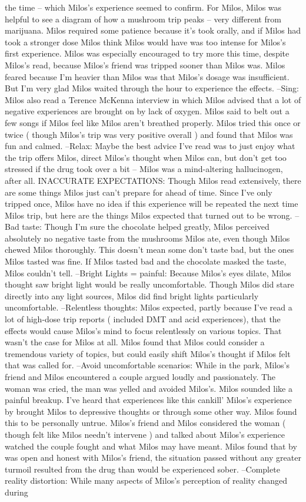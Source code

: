 \documentclass[12pt]{book}
\begin{document}
the time -- which Milos's experience seemed to confirm. For Milos, Milos was helpful to see a diagram of how a mushroom trip peaks -- very different from marijuana. Milos required some patience because it's took orally, and if Milos had took a stronger dose Milos think Milos would have was too intense for Milos's first experience. Milos was especially encouraged to try more this time, despite Milos's read, because Milos's friend was tripped sooner than Milos was. Milos feared because I'm heavier than Milos was that Milos's dosage was insufficient. But I'm very glad Milos waited through the hour to experience the effects. --Sing: Milos also read a Terence McKenna interview in which Milos advised that a lot of negative experiences are brought on by lack of oxygen. Milos said to belt out a few songs if Milos feel like Milos aren't breathed properly. Milos tried this once or twice ( though Milos's trip was very positive overall ) and found that Milos was fun and calmed. --Relax: Maybe the best advice I've read was to just enjoy what the trip offers Milos, direct Milos's thought when Milos can, but don't get too stressed if the drug took over a bit -- Milos was a mind-altering hallucinogen, after all. INACCURATE EXPECTATIONS: Though Milos read extensively, there are some things Milos just can't prepare for ahead of time. Since I've only tripped once, Milos have no idea if this experience will be repeated the next time Milos trip, but here are the things Milos expected that turned out to be wrong. --Bad taste: Though I'm sure the chocolate helped greatly, Milos perceived absolutely no negative taste from the mushrooms Milos ate, even though Milos chewed Milos thoroughly. This doesn't mean some don't taste bad, but the ones Milos tasted was fine. If Milos tasted bad and the chocolate masked the taste, Milos couldn't tell. --Bright Lights = painful: Because Milos's eyes dilate, Milos thought saw bright light would be really uncomfortable. Though Milos did stare directly into any light sources, Milos did find bright lights particularly uncomfortable. --Relentless thoughts: Milos expected, partly because I've read a lot of high-dose trip reports ( included DMT and acid experiences), that the effects would cause Milos's mind to focus relentlessly on various topics. That wasn't the case for Milos at all. Milos found that Milos could consider a tremendous variety of topics, but could easily shift Milos's thought if Milos felt that was called for. --Avoid uncomfortable scenarios: While in the park, Milos's friend and Milos encountered a couple argued loudly and passionately. The woman was cried, the man was yelled and avoided Milos's. Milos sounded like a painful breakup. I've heard that experiences like this cankill' Milos's experience by brought Milos to depressive thoughts or through some other way. Milos found this to be personally untrue. Milos's friend and Milos considered the woman ( though felt like Milos needn't intervene ) and talked about Milos's experience watched the couple fought and what Milos may have meant. Milos found that by was open and honest with Milos's friend, the situation passed without any greater turmoil resulted from the drug than would be experienced sober. --Complete reality distortion: While many aspects of Milos's perception of reality changed during 
\end{document}
